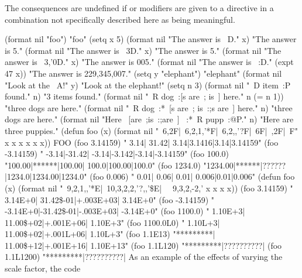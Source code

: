 
The consequences are undefined if  or  modifiers
are given to a directive in a combination not specifically described
here as being meaningful.

\endsubsubsection%

\endsubsection%


\code
 (format nil "foo") \EV "foo"
 (setq x 5) 
 (format nil "The answer is ~D." x) \EV "The answer is 5."
 (format nil "The answer is ~3D." x) \EV "The answer is   5."
 (format nil "The answer is ~3,'0D." x) \EV "The answer is 005."
 (format nil "The answer is ~:D." (expt 47 x))
\EV "The answer is 229,345,007."
 (setq y "elephant") \EV "elephant"
 (format nil "Look at the ~A!" y) \EV "Look at the elephant!"
 (setq n 3) 
 (format nil "~D item~:P found." n) \EV "3 items found."
 (format nil "~R dog~:[s are~; is~] here." n (= n 1))
\EV "three dogs are here."
 (format nil "~R dog~:*~[s are~; is~:;s are~] here." n)
\EV "three dogs are here."
 (format nil "Here ~[are~;is~:;are~] ~:*~R pupp~:@P." n)
\EV "Here are three puppies."
\endcode
\code
 (defun foo (x)
   (format nil "~6,2F|~6,2,1,'*F|~6,2,,'?F|~6F|~,2F|~F"
           x x x x x x)) \EV FOO
 (foo 3.14159)  \EV "  3.14| 31.42|  3.14|3.1416|3.14|3.14159"
 (foo -3.14159) \EV " -3.14|-31.42| -3.14|-3.142|-3.14|-3.14159"
 (foo 100.0)    \EV "100.00|******|100.00| 100.0|100.00|100.0"
 (foo 1234.0)   \EV "1234.00|******|??????|1234.0|1234.00|1234.0"
 (foo 0.006)    \EV "  0.01|  0.06|  0.01| 0.006|0.01|0.006"
\endcode
\code
 (defun foo (x)  
    (format nil
           "~9,2,1,,'*E|~10,3,2,2,'?,,'\$E|~
            ~9,3,2,-2,'%
           x x x x))
 (foo 3.14159)  \EV "  3.14E+0| 31.42\$-01|+.003E+03|  3.14E+0"
 (foo -3.14159) \EV " -3.14E+0|-31.42\$-01|-.003E+03| -3.14E+0"
 (foo 1100.0)   \EV "  1.10E+3| 11.00\$+02|+.001E+06|  1.10E+3"
 (foo 1100.0L0) \EV "  1.10L+3| 11.00\$+02|+.001L+06|  1.10L+3"
 (foo 1.1E13)   \EV "*********| 11.00\$+12|+.001E+16| 1.10E+13"
 (foo 1.1L120)  \EV "*********|??????????|%
 (foo 1.1L1200) \EV "*********|??????????|%
\endcode
As an example of the effects of varying the scale factor, the code

